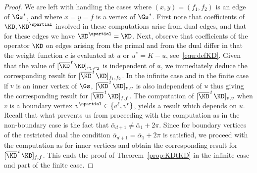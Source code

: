 \documentclass[a4paper,twoside,11pt]{article}
\begin{document}
\begin{proof}
We are left with handling the cases where $(x,y)=(f_1,f_2)$ is an edge of $\Gs^*$, and where $x=y=f$ is a vertex of $\Gs^*$.
First note that coefficients of $\KD,\KD^\spartial$ involved in these computations arise from dual edges, and that 
for these edges we have $\KD^\spartial=\KD$. Next, 
observe that coefficients of the operator $\KD$ on edges arising from the primal and from the dual differ in that 
the weight function $c$ is evaluated at $u$ or $u^*=K-u$, see~\eqref{equ:defKD}. Given that the value of 
$[\overline{\KD}^{\,t\,}\KD]_{v_1,v_2}$ is independent of $u$, we immediately deduce the corresponding result for
$[\overline{\KD}^{\,t\,}\KD]_{f_1,f_2}$. In the infinite case and in the finite case if 
$v$ is an inner vertex of $\Gs$, $[\overline{\KD}^{\,t\,}\KD]_{v,v}$ is also 
independent of $u$ thus giving the corresponding result for $[\overline{\KD}^{\,t\,}\KD]_{f,f}$. 
The computation of $[\overline{\KD}^{\,t\,}\KD]_{v,v}$ when 
$v$ is a boundary vertex $v^\spartial\in\{v^\ell,v^r\}$, yields a result which depends on $u$. Recall that what prevents us from 
proceeding with the computation as in the non-boundary case is the fact that $\bar{\alpha}_{d+1}\neq \bar{\alpha}_1+2\pi$.
Since for boundary vertices of the restricted dual the condition $\bar{\alpha}_{d+1}= \bar{\alpha}_1+2\pi$ is satisfied,
we proceed with the computation as for inner vertices and obtain the corresponding result for $[\overline{\KD}^{\,t\,}\KD]_{f,f}$.
This ends the proof of Theorem~\ref{prop:KDtKD} in the infinite case and part of the finite case.



\end{proof}
\end{document}
